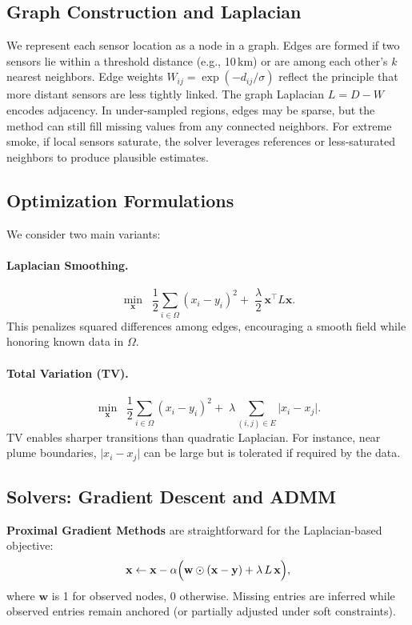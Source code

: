 \documentclass[12pt]{article}                                %
\begin{document}
\subsection{Graph Construction and Laplacian}   %
We represent each sensor location as a node in a graph. Edges are formed if two sensors lie 
within a threshold distance (e.g., 10\,km) or are among each other's $k$ nearest neighbors. 
Edge weights $W_{ij} = \exp(-d_{ij}/\sigma)$ reflect the principle that more distant sensors 
are less tightly linked. The graph Laplacian $L = D - W$ encodes adjacency. In under-sampled 
regions, edges may be sparse, but the method can still fill missing values from any connected 
neighbors. For extreme smoke, if local sensors saturate, the solver leverages references or 
less-saturated neighbors to produce plausible estimates.

\subsection{Optimization Formulations}  %
We consider two main variants:

\paragraph{Laplacian Smoothing.}  %
\[
\min_{\mathbf{x}} \;\;\frac{1}{2}\sum_{i\in \Omega} (x_i - y_i)^2 
+\;\frac{\lambda}{2}\,\mathbf{x}^\top L \mathbf{x}.
\]
This penalizes squared differences among edges, encouraging a smooth field while honoring 
known data in $\Omega$.

\paragraph{Total Variation (TV).}  %
\[
\min_{\mathbf{x}} \;\;\frac{1}{2}\sum_{i\in\Omega}(x_i - y_i)^2 
+\;\lambda \sum_{(i,j)\in E} \bigl|x_i - x_j\bigr|.
\]
TV enables sharper transitions than quadratic Laplacian. For instance, near plume boundaries, 
$\lvert x_i - x_j\rvert$ can be large but is tolerated if required by the data.

\subsection{Solvers: Gradient Descent and ADMM}   %
\textbf{Proximal Gradient Methods} are straightforward for the Laplacian-based objective:
\[
\mathbf{x} \leftarrow \mathbf{x} - \alpha\Bigl(\mathbf{w}\odot (\mathbf{x} - \mathbf{y}) 
+ \lambda\,L\,\mathbf{x}\Bigr),
\]
where $\mathbf{w}$ is 1 for observed nodes, 0 otherwise. Missing entries are inferred while 
observed entries remain anchored (or partially adjusted under soft constraints).
\end{document}
